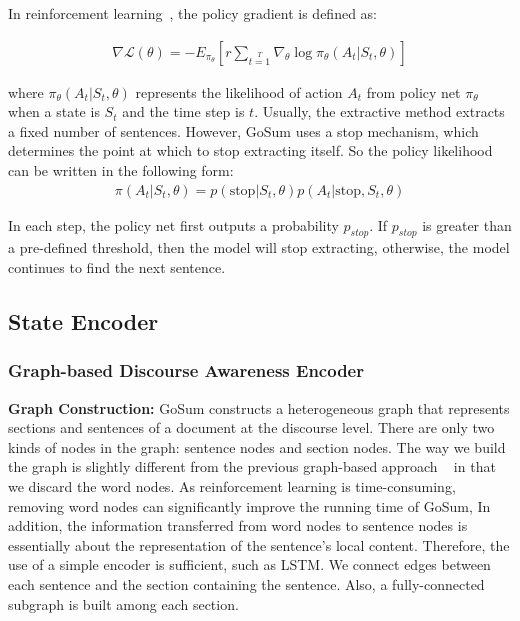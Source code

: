In reinforcement learning~\cite{rl_1992}, the policy gradient is defined as:

\begin{align}
    \nabla \mathcal{L} (\theta) = -E_{\pi_\theta} \left[  r \sum\limits_{t=1}\limits^T \nabla_{\theta} \log \pi_{\theta} (A_t|S_t,\theta)  \right]
\end{align}

where $\pi_{\theta} (A_t|S_t,\theta)$ represents the likelihood of action $A_t$ from policy net $\pi_{\theta}$ when a state is $S_t$ and the time step is $t$.
Usually, the extractive method extracts a fixed number of sentences. However, GoSum uses a stop mechanism, which  determines the point at which to stop extracting itself. So the policy likelihood can be written in the following form:
\begin{align}
    \pi(A_t|S_t,\theta) = p(\text{stop} | S_t, \theta) p(A_t|\text{stop}, S_t,\theta)
\end{align}

In each step, the policy net first outputs a probability $p_{stop}$. If $p_{stop}$ is greater than a pre-defined threshold, then the model will stop extracting, otherwise, the model continues to find the next sentence.

\subsection{State Encoder}

\subsubsection{Graph-based Discourse Awareness Encoder}

\noindent \textbf{Graph Construction:}
GoSum constructs a heterogeneous graph that represents sections and sentences of a document at the discourse level.
There are only two kinds of nodes in the graph: sentence nodes and section nodes.
The way we build the graph is slightly different from the previous graph-based approach ~\cite{discourse_2021,hsg_2020,hahsum_2020} in that we discard the word nodes.
As reinforcement learning is  time-consuming, removing word nodes can significantly improve the running time  of GoSum, 
In addition, the information transferred from word nodes to sentence nodes is essentially about the representation of the sentence's local content.  Therefore, the use of a simple encoder is sufficient, such as LSTM.
We connect edges between each sentence and the section containing the sentence.
Also, a fully-connected subgraph is built among each section.

